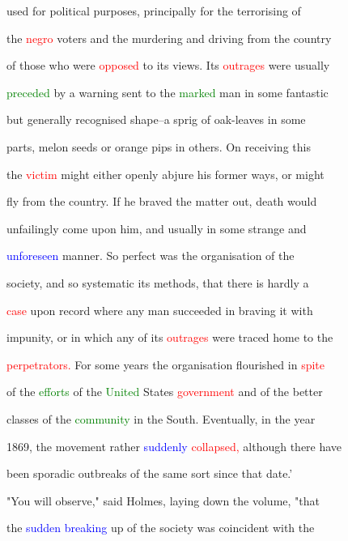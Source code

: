  used for political purposes, principally for the terrorising of

 the \textcolor{red}{negro} voters and the \textcolor{BurntOrange}{murdering} and driving from the country

 of those who were \textcolor{red}{opposed} to its views. Its \textcolor{red}{outrages} were usually

 \textcolor{green}{preceded} by a \textcolor{BurntOrange}{warning} sent to the \textcolor{green}{marked} man in some fantastic

 but generally recognised shape--a sprig of oak-leaves in some

 parts, melon seeds or orange pips in others. On receiving this

 the \textcolor{red}{victim} might either openly abjure his former ways, or might

 fly from the country. If he braved the matter out, \textcolor{BurntOrange}{death} would

 unfailingly come upon him, and usually in some strange and

 \textcolor{blue}{unforeseen} manner. So \textcolor{BurntOrange}{perfect} was the organisation of the

 society, and so systematic its methods, that there is hardly a

 \textcolor{red}{case} upon record where any man \textcolor{BurntOrange}{succeeded} in braving it with

 impunity, or in which any of its \textcolor{red}{outrages} were traced home to the

 \textcolor{red}{perpetrators.} For some years the organisation flourished in \textcolor{red}{spite}

 of the \textcolor{green}{efforts} of the \textcolor{green}{United} States \textcolor{red}{government} and of the better

 classes of the \textcolor{green}{community} in the South. Eventually, in the year

 1869, the movement rather \textcolor{blue}{suddenly} \textcolor{red}{collapsed,} although there have

 been sporadic outbreaks of the same sort since that date.'



 "You will observe," said Holmes, laying down the volume, "that

 the \textcolor{blue}{sudden} \textcolor{blue}{breaking} up of the society was coincident with the

